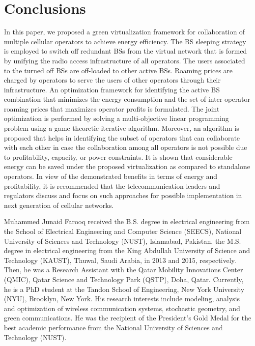 \documentclass[10pt, letter, twocolumn]{IEEEtran}
\begin{document}
\section{Conclusions} \label{sec9}
In this paper, we proposed a green virtualization framework for collaboration of multiple cellular operators to achieve energy efficiency. The BS sleeping strategy is employed to switch off redundant BSs from the virtual network that is formed by unifying the radio access infrastructure of all operators. The users associated to the turned off BSs are off-loaded to other active BSs. Roaming prices are charged by operators to serve the users of other operators through their infrastructure. An optimization framework for identifying the active BS combination that minimizes the energy consumption and the set of inter-operator roaming prices that maximizes operator profits is formulated. The joint optimization is performed by solving a multi-objective linear programming problem using a game theoretic iterative algorithm. Moreover, an algorithm is proposed that helps in identifying the subset of operators that can collaborate with each other in case the collaboration among all operators is not possible due to profitability, capacity, or power constraints. It is shown that considerable energy can be saved under the proposed virtualization as compared to standalone operators. In view of the demonstrated benefits in terms of energy and profitability, it is recommended that the telecommunication leaders and regulators discuss and focus on such approaches for possible implementation in next generation of cellular networks.




\begin{IEEEbiography}
    {Muhammed Junaid Farooq} received the B.S. degree in electrical engineering from the School of Electrical Engineering and Computer Science (SEECS), National University of Sciences and Technology (NUST), Islamabad, Pakistan, the M.S. degree in electrical engineering from the King Abdullah University of Science and Technology (KAUST), Thuwal, Saudi Arabia, in 2013 and 2015, respectively. Then, he was a Research Assistant with the Qatar Mobility Innovations Center (QMIC), Qatar Science and Technology Park (QSTP), Doha, Qatar. Currently, he is a PhD student at the Tandon School of Engineering, New York University (NYU), Brooklyn, New York. His research interests include modeling, analysis and optimization of wireless communication systems, stochastic geometry, and green communications. He was the recipient of the President's Gold Medal for the best academic performance from the National University of Sciences and Technology (NUST).
\end{IEEEbiography}
\end{document}
